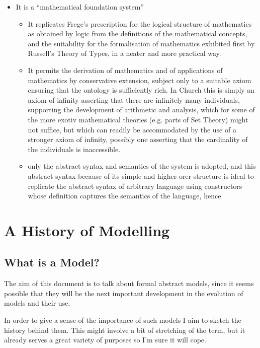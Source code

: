 \documentclass[10pt,titlepage]{book}
\begin{document}
\begin{itemize}
\item It is a ``mathematical foundation system''
  \begin{itemize}
  \item It replicates Frege's prescription for the logical structure of mathematics as obtained by logic from the definitions of the mathematical concepts,  and the suitability for the formalisation of mathematics exhibited first by Russell's Theory of Types, in a neater and more practical way.
  \item It permits the derivation of mathematics and of applications of mathematics by conservative extension, subject only to a suitable axiom ensuring that the ontology is sufficiently rich.
    In Church this is simply an axiom of infinity asserting that there are infinitely many individuals, supporting the development of arithmetic and analysis, which for some of the more exotiv mathematical theories (e.g. parts of Set Theory) might not suffice, but which can readily be accommodated by the use of a stronger axiom of infinity, possibly one asserting that the cardinality of the individuals is inaccessible.
    \item only the abstract syntax and semantics of the system is adopted, and this abstract syntax because of its simple and higher-orer structure is ideal to replicate the abstract syntax of arbitrary language using constructors whose definition captures the semantics of the language, hence 
    \end{itemize}
\end{itemize}

\cite{gordon1989mechanizing,birtwistle2012current}

\cite{cohnPIHV}
\cite{mccarthy2022artificial}

\section{A History of Modelling}

\subsection{What is a Model?}

The aim of this document is to talk about formal abstract models, since it seems possible that they will be the next important development in the evolution of models and their use.

In order to give a sense of the importance of such models I aim to sketch the history behind them.
This might involve a bit of stretching of the term, but it already serves a great variety of purposes so I'm sure it will cope.
\end{document}
